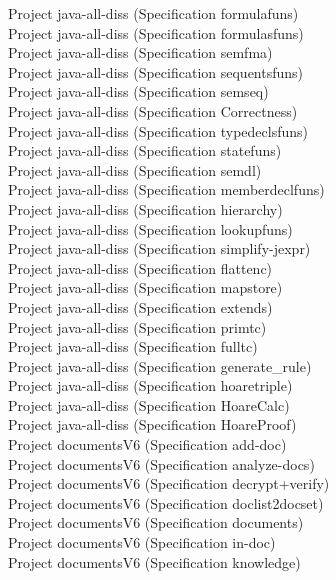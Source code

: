 \documentclass[a4paper]{article}
\begin{document}
\begin{itemize}
Project java-all-diss (Specification formulafuns) \\
Project java-all-diss (Specification formulasfuns) \\
Project java-all-diss (Specification semfma) \\
Project java-all-diss (Specification sequentsfuns) \\
Project java-all-diss (Specification semseq) \\
Project java-all-diss (Specification Correctness) \\
Project java-all-diss (Specification typedeclsfuns) \\
Project java-all-diss (Specification statefuns) \\
Project java-all-diss (Specification semdl) \\
Project java-all-diss (Specification memberdeclfuns) \\
Project java-all-diss (Specification hierarchy) \\
Project java-all-diss (Specification lookupfuns) \\
Project java-all-diss (Specification simplify-jexpr) \\
Project java-all-diss (Specification flattenc) \\
Project java-all-diss (Specification mapstore) \\
Project java-all-diss (Specification extends) \\
Project java-all-diss (Specification primtc) \\
Project java-all-diss (Specification fulltc) \\
Project java-all-diss (Specification generate\_rule) \\
Project java-all-diss (Specification hoaretriple) \\
Project java-all-diss (Specification HoareCalc) \\
Project java-all-diss (Specification HoareProof) \\
Project documentsV6 (Specification add-doc) \\
Project documentsV6 (Specification analyze-docs) \\
Project documentsV6 (Specification decrypt+verify) \\
Project documentsV6 (Specification doclist2docset) \\
Project documentsV6 (Specification documents) \\
Project documentsV6 (Specification in-doc) \\
Project documentsV6 (Specification knowledge) \\

\end{itemize}
\end{document}
